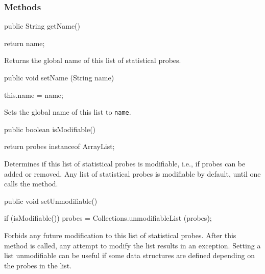 \subsubsection*{Methods}
\begin{code}

   public String getName()\begin{hide} {
      return name;
   }\end{hide}
\end{code}
\begin{tabb}   Returns the global name of this list of statistical probes.
\end{tabb}
\begin{htmlonly}
\end{htmlonly}
\begin{code}

   public void setName (String name)\begin{hide} {
      this.name = name;
   }\end{hide}
\end{code}
\begin{tabb}   Sets the global name of this list to \texttt{name}.
\end{tabb}
\begin{htmlonly}
\end{htmlonly}
\begin{code}

   public boolean isModifiable()\begin{hide} {
      return probes instanceof ArrayList;
   }\end{hide}
\end{code}
\begin{tabb}   Determines if this list of statistical probes is
  modifiable, i.e., if probes can be added or removed.
  Any list of statistical probes is modifiable by default, until one calls the
   method.
\end{tabb}
\begin{code}

   public void setUnmodifiable()\begin{hide} {
      if (isModifiable())
         probes = Collections.unmodifiableList (probes);
   }\end{hide}
\end{code}
\begin{tabb}  Forbids any future modification to this list of
  statistical probes.
  After this method is called, any attempt to modify the list results
  in an exception.
   Setting a list unmodifiable can be useful if some data structures
   are defined depending on the probes in the list.
\end{tabb}

